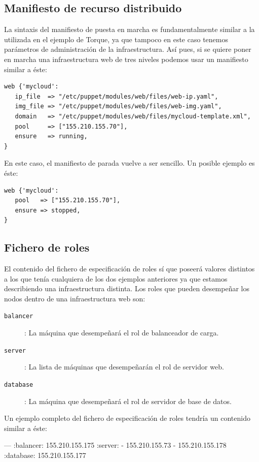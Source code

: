 
\subsection{Manifiesto de recurso distribuido}

La sintaxis del manifiesto de puesta en marcha es fundamentalmente similar a la utilizada en el ejemplo de Torque, ya que tampoco en este caso tenemos parámetros de administración de la infraestructura. Así pues, si se quiere poner en marcha una infraestructura web de tres niveles podemos usar un manifiesto similar a éste:

\begin{lstlisting}
web {'mycloud':
   ip_file  => "/etc/puppet/modules/web/files/web-ip.yaml",
   img_file => "/etc/puppet/modules/web/files/web-img.yaml",
   domain   => "/etc/puppet/modules/web/files/mycloud-template.xml",
   pool     => ["155.210.155.70"],
   ensure   => running,
}
\end{lstlisting}

En este caso, el manifiesto de parada vuelve a ser sencillo. Un posible ejemplo es éste:

\begin{lstlisting}
web {'mycloud':
   pool   => ["155.210.155.70"],
   ensure => stopped,
}
\end{lstlisting}

\subsection{Fichero de roles}

El contenido del fichero de especificación de roles sí que poseerá valores distintos a los que tenía cualquiera de los dos ejemplos anteriores ya que estamos describiendo una infraestructura distinta. Los roles que pueden desempeñar los nodos dentro de una infraestructura web son:
\begin{description}
\item[\texttt{balancer}]: La máquina que desempeñará el rol de balanceador de carga.
\item[\texttt{server}]: La lista de máquinas que desempeñarán el rol de servidor web.
\item[\texttt{database}]: La máquina que desempeñará el rol de servidor de base de datos.
\end{description}

Un ejemplo completo del fichero de especificación de roles tendría un contenido similar a éste:
\begin{yamlcode}
--- 
:balancer: 155.210.155.175
:server:
- 155.210.155.73
- 155.210.155.178
:database: 155.210.155.177
\end{yamlcode}
